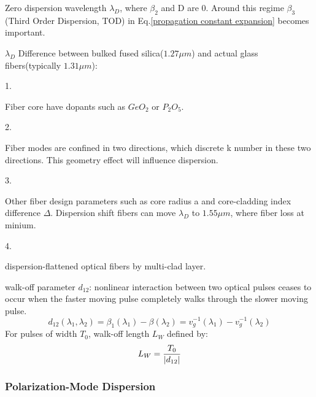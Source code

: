 \documentclass[12pt]{extarticle}
\newcommand{\<}{\langle}
\renewcommand{\>}{\rangle}
\theoremstyle{definition}
\newcommand{\SubItem}[1]{
    {\setlength\itemindent{15pt} \item[-] #1}
}
\begin{document}
\begin{itemize}
                \item Zero dispersion wavelength $\lambda_D$, where $\beta_2$ and D are 0. Around this regime $\beta_3$ (Third Order Dispersion, TOD) in Eq.\ref{propagation constant expansion} becomes important. 
                
                \item $\lambda_D$ Difference between bulked fused silica($1.27\mu m$) and actual glass fibers(typically $1.31\mu m$):
                    \SubItem{1.} Fiber core have dopants such as $GeO_2$ or $P_2O_5$.
                    \SubItem{2.} Fiber modes are confined in two directions, which discrete k number in these two directions. This geometry effect will influence dispersion.
                    \SubItem{3.} Other fiber design parameters such as core radius a and core-cladding index difference $\Delta$. Dispersion shift fibers can move $\lambda_D$ to $1.55\mu m$, where fiber loss at minium.
                    \SubItem{4.} dispersion-flattened optical fibers by multi-clad layer.
                    
                \item walk-off parameter $d_{12}$: nonlinear interaction between two optical pulses ceases
                to occur when the faster moving pulse completely walks through the slower moving pulse.
                    \begin{equation}
                        d_{12}(\lambda_1,\lambda_2) = \beta_1(\lambda_1)-\beta(\lambda_2) = v_g^{-1}(\lambda_1)-v_g^{-1}(\lambda_2)
                        \label{d12 definition}
                    \end{equation}
                    For pulses of width $T_0$, walk-off length $L_W$ defined by:
                    \begin{equation}
                        L_W = \frac{T_0}{\abs{d_{12}}}
                        \label{LW definition}
                    \end{equation}
            \end{itemize}
        
        
        \subsubsection{Polarization-Mode Dispersion}
            
            



\end{document}
